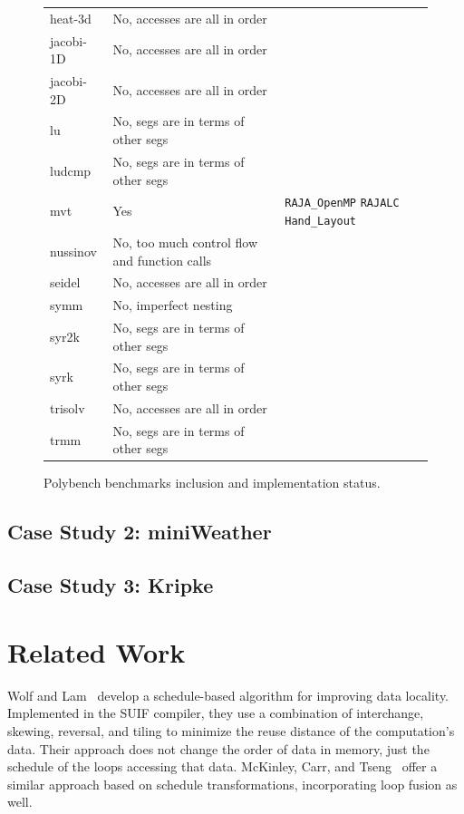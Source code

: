 \documentclass[sigconf, table]{acmart}
\begin{document}
\begin{figure}
\begin{tabular}{lll}
heat-3d     & No, accesses are all in order            \\
jacobi-1D   & No, accesses are all in order           \\
jacobi-2D   & No, accesses are all in order           \\
lu          & No, segs are in terms of other segs         \\
ludcmp      & No, segs are in terms of other segs \\
mvt         & Yes        & \verb.RAJA_OpenMP. \verb.RAJALC. \verb.Hand_Layout.\\
nussinov    & No, too much control flow and function calls          \\
seidel      & No, accesses are all in order           \\
symm        & No, imperfect nesting           \\
syr2k       & No, segs are in terms of other segs         \\
syrk        & No, segs are in terms of other segs        \\
trisolv     & No, accesses are all in order           \\
trmm        & No, segs are in terms of other segs         
\end{tabular}
\caption{Polybench benchmarks inclusion and implementation status.}
\end{figure}




\subsection{Case Study 2: miniWeather}

\subsection{Case Study 3: Kripke}

\section{Related Work}

Wolf and Lam~\cite{wolf1991data} develop a schedule-based algorithm for improving data locality. 
Implemented in the SUIF compiler, they use a combination of interchange, skewing, reversal, and tiling to minimize the reuse distance of the computation's data. 
Their approach does not change the order of data in memory, just the schedule of the loops accessing that data.
McKinley, Carr, and Tseng~\cite{mckinley1996improving} offer a similar approach based on schedule transformations, incorporating loop fusion as well.
\end{document}
